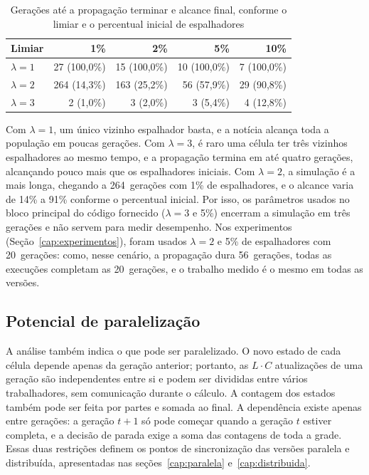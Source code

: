 \begin{table}[htb]
    \centering
    \caption{Gerações até a propagação terminar e alcance final, conforme o limiar e o percentual inicial de espalhadores}
    \label{tab:custo-limiar}
    \begin{tabular}{lrrrr}
        \toprule
        \textbf{Limiar} & \textbf{1\%} & \textbf{2\%} & \textbf{5\%} & \textbf{10\%} \\
        \midrule
        $\lambda = 1$ & 27 (100,0\%) & 15 (100,0\%) & 10 (100,0\%) & 7 (100,0\%) \\
        $\lambda = 2$ & 264 (14,3\%) & 163 (25,2\%) & 56 (57,9\%) & 29 (90,8\%) \\
        $\lambda = 3$ & 2 (1,0\%) & 3 (2,0\%) & 3 (5,4\%) & 4 (12,8\%) \\
        \bottomrule
    \end{tabular}
    \fonte{}
\end{table}

Com $\lambda = 1$, um único vizinho espalhador basta, e a notícia alcança toda a população em poucas gerações. Com $\lambda = 3$, é raro uma célula ter três vizinhos espalhadores ao mesmo tempo, e a propagação termina em até quatro gerações, alcançando pouco mais que os espalhadores iniciais. Com $\lambda = 2$, a simulação é a mais longa, chegando a 264~gerações com 1\% de espalhadores, e o alcance varia de 14\% a 91\% conforme o percentual inicial. Por isso, os parâmetros usados no bloco principal do código fornecido ($\lambda = 3$ e 5\%) encerram a simulação em três gerações e não servem para medir desempenho. Nos experimentos (Seção~\ref{cap:experimentos}), foram usados $\lambda = 2$ e 5\% de espalhadores com 20~gerações: como, nesse cenário, a propagação dura 56~gerações, todas as execuções completam as 20~gerações, e o trabalho medido é o mesmo em todas as versões.

\subsection{Potencial de paralelização}\label{sub:custo-paralelizacao}

A análise também indica o que pode ser paralelizado. O novo estado de cada célula depende apenas da geração anterior; portanto, as $L \cdot C$ atualizações de uma geração são independentes entre si e podem ser divididas entre vários trabalhadores, sem comunicação durante o cálculo. A contagem dos estados também pode ser feita por partes e somada ao final. A dependência existe apenas entre gerações: a geração $t+1$ só pode começar quando a geração $t$ estiver completa, e a decisão de parada exige a soma das contagens de toda a grade. Essas duas restrições definem os pontos de sincronização das versões paralela e distribuída, apresentadas nas seções~\ref{cap:paralela} e~\ref{cap:distribuida}.
